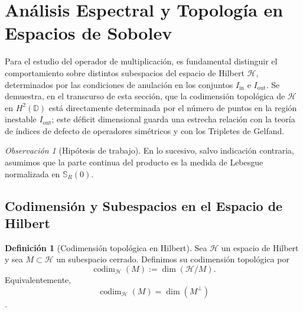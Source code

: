 \documentclass[12pt,a4paper]{article}
\theoremstyle{definition}
\newtheorem{definition}{Definición}
\theoremstyle{remark}
\newtheorem{remark}{Observación}
\begin{document}
\section{Análisis Espectral y Topología en Espacios de Sobolev}\label{sec:espectral}

Para el estudio del operador de multiplicación, es fundamental distinguir el comportamiento sobre distintos subespacios del espacio de Hilbert $\mathcal{H}$, determinados por las condiciones de anulación en los conjuntos $I_{\mathrm{in}}$ e $I_{\mathrm{out}}$. Se demuestra, en el transcurso de esta sección, que la codimensión topológica de $\mathcal{H}$ en $H^2(\mathbb{D})$ está directamente determinada por el número de puntos en la región inestable $I_{\mathrm{out}}$; este déficit dimensional guarda una estrecha relación con la teoría de índices de defecto de operadores simétricos y con los Tripletes de Gelfand.

\begin{remark}[Hipótesis de trabajo]
  En lo sucesivo, salvo indicación contraria, asumimos que la parte continua del producto es la medida de Lebesgue normalizada en $\mathbb{S}_R(0)$.
\end{remark}

\subsection{Codimensión y Subespacios en el Espacio de Hilbert}

\begin{definition}[Codimensión topológica en Hilbert]\label{def:codim_top_hilbert}
  Sea $\mathcal{H}$ un espacio de Hilbert y sea $M\subset \mathcal{H}$ un subespacio cerrado. Definimos su codimensión topológica por
  $$
    \operatorname{codim}_{\mathcal{H}}(M):=\dim(\mathcal{H}/M).
  $$
  Equivalentemente,
  $$
    \operatorname{codim}_{\mathcal{H}}(M)=\dim(M^\perp)
  $$
  \cite{halmos1982hilbert}.
\end{definition}
\end{document}
